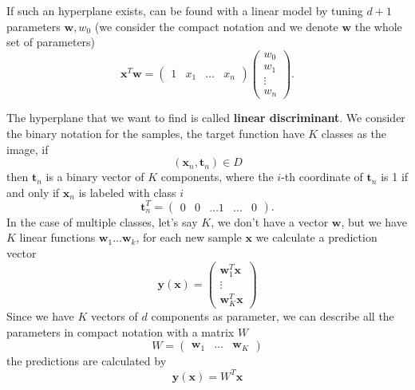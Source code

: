 \documentclass[10pt, letterpaper]{report}
\begin{document}
If such an hyperplane exists, can be found with a linear model by tuning $d+1$ parameters $\mathbf w, w_0$ (we consider the compact notation and we denote $\mathbf w$ the whole set of parameters) $$ \mathbf x^T\mathbf w=\begin{pmatrix}
    1&x_1 &\dots & x_n
\end{pmatrix}\begin{pmatrix}
    w_0\\w_1 \\\vdots \\ w_n
\end{pmatrix}.$$

The hyperplane that we want to find is called \textbf{linear discriminant}. 
We consider the binary notation for the samples, the target function have $K$ classes as the image, if 
$$ (\mathbf x_n,\mathbf t_n)\in D$$
then $\mathbf t_n$ is a binary vector of $K$ components, where the $i$-th coordinate of  $\mathbf t_n$ is 1 if and only if $\mathbf x_n$ is labeled with class $i$
$$ 
\mathbf t^T_n=\begin{pmatrix}
    0&0&\dots 1 & \dots & 0
\end{pmatrix}
.
$$
In the case of multiple classes, let's say $K$, we don't have a vector $\mathbf w$, but we have $K$ linear functions $\mathbf w_1\dots \mathbf w_k$, for each new sample $\mathbf x$ we calculate a prediction vector\begin{equation}
    \mathbf y(\mathbf x)=\begin{pmatrix}
        \mathbf w_1^T\mathbf x\\ \vdots \\ \mathbf w_K^T\mathbf x
    \end{pmatrix}
\end{equation}
Since we have $K$ vectors of $d$ components as parameter, we can describe all the parameters in compact notation with a matrix $W$\begin{equation}
    W=\begin{pmatrix}
        \mathbf w_1& \dots& \mathbf w_K
    \end{pmatrix}
\end{equation}
the predictions are calculated by\begin{equation}
    \mathbf y(\mathbf x)=W^T\mathbf x
\end{equation}
\end{document}
